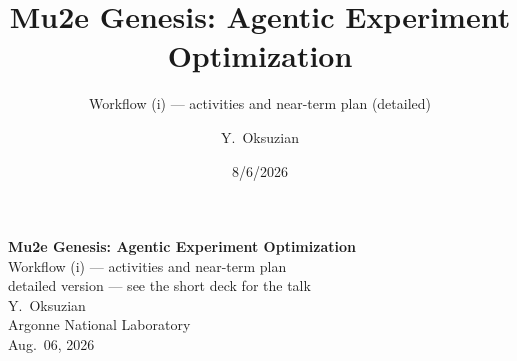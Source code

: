\documentclass[aspectratio=169,10pt]{beamer}
\title{\textcolor{fnalblue}{\textbf{Mu2e Genesis: Agentic Experiment Optimization}}}
\subtitle{\textcolor{fnalblue}{Workflow (i) --- activities and near-term plan (detailed)}}
\author{Y.\ Oksuzian}
\institute{Argonne National Laboratory}
\date{8/6/2026}
\begin{document}
\begin{frame}[plain]
\vspace{2.2em}
\begin{center}
{\LARGE\bfseries\color{fnalblue} Mu2e Genesis: Agentic Experiment Optimization}\\[0.8em]
{\large\color{fnalblue} Workflow (i) --- activities and near-term plan}\\[0.4em]
{\small\color{fnalblue} detailed version --- see the short deck for the talk}\\[3.0em]
{\large Y.\ Oksuzian}\\[0.3em]
{\large Argonne National Laboratory}\\[0.3em]
{\large Aug.\ 06, 2026}
\end{center}
\end{frame}
\end{document}
